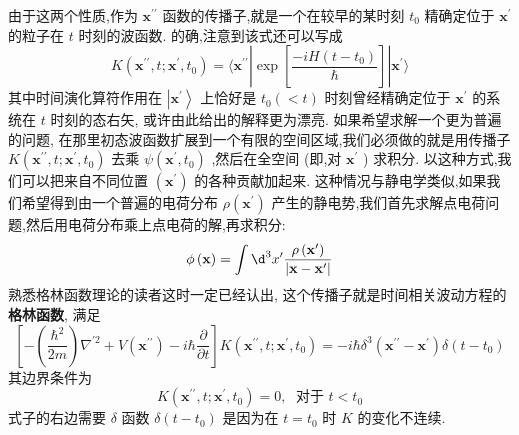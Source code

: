 \documentclass[lang=cn,newtx,10pt,scheme=chinese,thmcnt=section]{elegantbook}
\begin{document}
由于这两个性质,作为 ${\mathbf{x}}^{\prime \prime }$ 函数的传播子,就是一个在较早的某时刻 ${t}_{0}$ 精确定位于 ${\mathbf{x}}^{\prime }$ 的粒子在 $t$ 时刻的波函数. 的确,注意到该式还可以写成
\begin{equation}
	K\left( {{\mathbf{x}}^{\prime \prime }, t;{\mathbf{x}}^{\prime },{t}_{0}}\right) = \langle {{\mathbf{x}}^{\prime \prime }\left| {\exp \left\lbrack \frac{-{iH}\left( {t - {t}_{0}}\right) }{\hbar }\right\rbrack }\right| {\mathbf{x}}^{\prime }}\rangle
\end{equation}
其中时间演化算符作用在 $\left| {\mathbf{x}}^{\prime }\right\rangle$ 上恰好是 ${t}_{0}\left( { < t}\right)$ 时刻曾经精确定位于 ${\mathbf{x}}^{\prime }$ 的系统在 $t$ 时刻的态右矢, 或许由此给出的解释更为漂亮. 如果希望求解一个更为普遍的问题, 在那里初态波函数扩展到一个有限的空间区域,我们必须做的就是用传播子 $K\left( {{\mathbf{x}}^{\prime \prime }, t;{\mathbf{x}}^{\prime },{t}_{0}}\right)$ 去乘 $\psi \left( {{\mathbf{x}}^{\prime },{t}_{0}}\right)$ ,然后在全空间 (即,对 ${\mathbf{x}}^{\prime }$ ) 求积分. 以这种方式,我们可以把来自不同位置 $\left( {\mathbf{x}}^{\prime }\right)$ 的各种贡献加起来. 这种情况与静电学类似,如果我们希望得到由一个普遍的电荷分布 $\rho \left( {\mathbf{x}}^{\prime }\right)$ 产生的静电势,我们首先求解点电荷问题,然后用电荷分布乘上点电荷的解,再求积分:
\begin{equation}
	\phi \left( \mathbf{x}\right) = \int {\d}^{3}{x}^{\prime }\frac{\rho \left( {\mathbf{x}}^{\prime }\right) }{\left| \mathbf{x} - {\mathbf{x}}^{\prime }\right| }
\end{equation}
熟悉格林函数理论的读者这时一定已经认出, 这个传播子就是时间相关波动方程的\textbf{格林函数}, 满足
\begin{equation}
	\left\lbrack {-\left( \frac{{\hbar }^{2}}{2m}\right) {\nabla }^{\prime 2} + V\left( {\mathbf{x}}^{\prime \prime }\right) - i\hbar \frac{\partial }{\partial t}}\right\rbrack K\left( {{\mathbf{x}}^{\prime \prime }, t;{\mathbf{x}}^{\prime },{t}_{0}}\right) = - i\hbar {\delta }^{3}\left( {{\mathbf{x}}^{\prime \prime } - {\mathbf{x}}^{\prime }}\right) \delta \left( {t - {t}_{0}}\right)
\end{equation}
其边界条件为
\begin{equation}
	K\left( {{\mathbf{x}}^{\prime \prime }, t;{\mathbf{x}}^{\prime },{t}_{0}}\right) = 0,\;\text{ 对于 }t < {t}_{0}
\end{equation}
式子的右边需要 $\delta$ 函数 $\delta \left( {t - {t}_{0}}\right)$ 是因为在 $t = {t}_{0}$ 时 $K$ 的变化不连续.
\end{document}

